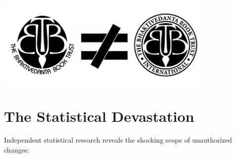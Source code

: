 \documentclass[11pt,twoside]{book}
\begin{document}
\begin{center}
\includegraphics[width=0.8\textwidth]{bbti.png}
\end{center}
\vspace{0.5cm}
\section*{The Statistical Devastation}
\label{sec:org2ef713f}

Independent statistical research reveals the shocking scope of unauthorized changes:
\end{document}
